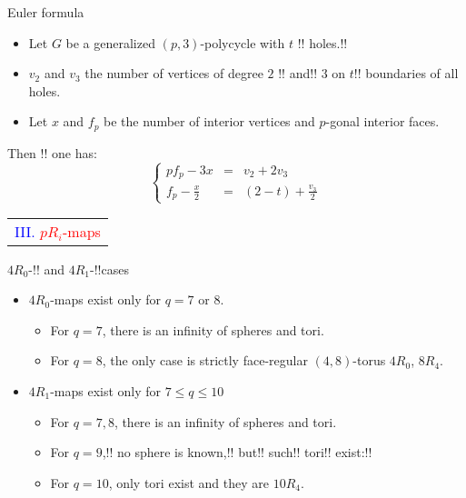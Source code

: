 \documentclass[%
pdf,
colorBG,
slideColor,
]{prosper}
\begin{document}
\begin{slide}{Euler formula}
\begin{itemize}
\item Let $G$ be a generalized $(p,3)$-polycycle with $t$ 
!!%
holes.!!
\item $v_2$ and $v_3$ the number of vertices of degree $2$
!!%
and!! $3$ on $t$!! boundaries of all holes.
\item Let $x$ and $f_p$ be the number of interior vertices and $p$-gonal interior faces.
\end{itemize}
Then
!!%
one has:
\begin{equation*}
\left\lbrace\begin{array}{rcl}
pf_p-3x         &=& v_2+2v_3\\
f_p-\frac{x}{2} &=& (2-t)+\frac{v_3}{2}
\end{array}\right.
\end{equation*}


\end{slide}


\begin{slide}{}
\begin{center}
{\Huge 
\begin{tabular*}{7cm}{c}
\\[-0.5cm]
\textcolor{blue}{III. }\textcolor{red}{$pR_i$-maps}
\end{tabular*}
}
\end{center}
\end{slide}


\begin{slide}{$4R_0$-!! and $4R_1$-!!cases}
\begin{itemize}
\item $4R_0$-maps exist only for $q=7$ or $8$.
\begin{itemize}
\item For $q=7$, there is an infinity of spheres and tori.
\item For $q=8$, the only case is strictly face-regular $(4,8)$-torus 
$4R_0$, $8R_4$.
\end{itemize}
\item $4R_1$-maps exist only for $7\leq q\leq 10$
\begin{itemize}
\item For $q=7,8$, there is an infinity of spheres and tori.
\item For $q=9$,!! no sphere is known,!! but!! such!! tori!! exist:!!
\begin{center}
\begin{minipage}{5cm}
\centering
{}\par
\end{minipage}
\end{center}
\item For $q=10$, only tori exist and they are $10R_4$.
\end{itemize}

\end{itemize}

\end{slide}
\end{document}
